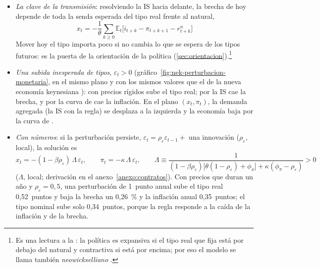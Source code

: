 \documentclass[11pt]{article}
\begin{document}
\begin{infografia}[H]
\centering
\caption{El modelo canónico: 3~ecuaciones que se cierran entre sí}\label{figu:nek-esquema}
\end{infografia}

\begin{itemize}
\item \emph{La clave de la transmisión}: resolviendo la IS hacia delante, la brecha de hoy depende de toda la senda esperada del tipo real frente al natural,
  \begin{equation}
  x_t=-\frac{1}{\theta}\sum_{k\geq0}\mathbb{E}_t\big[i_{t+k}-\pi_{t+k+1}-r^n_{t+k}\big] \label{eq:is-prospectiva}
  \end{equation}
  Mover hoy el tipo importa poco si no cambia lo que se espera de los tipos futuros: es la puerta de la orientación de la política (\ref{sec:orientacion}).\footnote{Es una lectura a la : la política es expansiva si el tipo real que fija está por debajo del natural y contractiva si está por encima; por eso el modelo se llama también \emph{neowickselliano}\nocite{Woodford2003Interest} .}
\item \emph{Una subida inesperada de tipos}, $\varepsilon_t>0$ (gráfico~\ref{fig:nek-perturbacion-monetaria}, en el mismo plano y con los mismos valores que el de la nueva economía keynesiana ): con precios rígidos sube el tipo real; por la IS cae la brecha, y por la curva de  cae la inflación. En el plano $(x_t,\pi_t)$, la demanda agregada (la IS con la regla) se desplaza a la izquierda y la economía baja por la curva de .
\item \emph{Con números}\nocite{Gali2015Monetary}: si la perturbación persiste, $\varepsilon_t=\rho_\varepsilon\varepsilon_{t-1}+$ una innovación ($\rho_\varepsilon$, local), la solución es
  \begin{equation}
  x_t=-(1-\beta\rho_\varepsilon)\,\Lambda\,\varepsilon_t,\qquad \pi_t=-\kappa\,\Lambda\,\varepsilon_t,\qquad \Lambda\equiv\frac{1}{(1-\beta\rho_\varepsilon)\big[\theta(1-\rho_\varepsilon)+\phi_x\big]+\kappa(\phi_\pi-\rho_\varepsilon)}>0 \label{eq:respuesta-monetaria}
  \end{equation}
  ($\Lambda$, local; derivación en el anexo~\ref{anexo:contratos}). Con precios que duran un año y $\rho_\varepsilon=0{,}5$, una perturbación de 1~punto anual sube el tipo real 0,52~puntos y baja la brecha un 0,26~\% y la inflación anual 0,35~puntos; el tipo nominal sube solo 0,34~puntos, porque la regla responde a la caída de la inflación y de la brecha.
\end{itemize}
\end{document}
